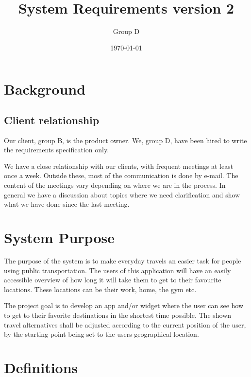 \documentclass[a4paper]{article}
\title{System Requirements version 2}
\author{Group D}
\date{\today}
\begin{document}
	\maketitle
	\thispagestyle{empty}
	\setcounter{page}{0}
	\pagebreak
	\tableofcontents
	\pagebreak
	



	\section{Background} %
	\label{sec:background}
	
		\subsection{Client relationship}
	Our client, group B, is the product owner. We, group D, have been hired to write the requirements specification only.
	
	
We have a close relationship with our clients, with frequent meetings at least once a week. Outside these, most of the communication is done by e-mail. The content of the meetings vary depending on where we are in the process. In general we have a discussion about topics where we need clarification and show what we have done since the last meeting.

	\section{System Purpose} %
	The purpose of the system is to make everyday travels an easier task for people using public transportation. The users of this application will have an easily accessible overview of how long it will take them to get to their favourite locations. These locations can be their work, home, the gym etc.
	
	
The project goal is to develop an app and/or widget where the user can see how to get to their favorite destinations in the shortest time possible. The shown travel alternatives shall be adjusted according to the current position of the user, by the starting point being set to the users geographical location.
	\section{Definitions}
		
\end{document}
